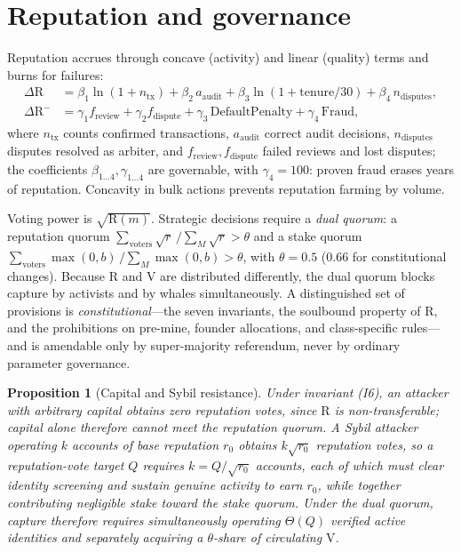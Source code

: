 \documentclass[11pt]{article}
\theoremstyle{plain}
\newtheorem{proposition}{Proposition}
\theoremstyle{definition}
\theoremstyle{remark}
\newcommand{\V}{\mathrm{V}}
\newcommand{\R}{\mathrm{R}}
\begin{document}
\section{Reputation and governance}

Reputation accrues through concave (activity) and linear (quality) terms and burns for failures:
\begin{align}
\Delta \R &= \beta_1 \ln(1 + n_{\mathrm{tx}}) + \beta_2\, a_{\mathrm{audit}} + \beta_3 \ln(1 + \text{tenure}/30) + \beta_4\, n_{\mathrm{disputes}},\\
\Delta \R^{-} &= \gamma_1 f_{\mathrm{review}} + \gamma_2 f_{\mathrm{dispute}} + \gamma_3\, \mathrm{DefaultPenalty} + \gamma_4\, \mathrm{Fraud},
\end{align}
where $n_{\mathrm{tx}}$ counts confirmed transactions, $a_{\mathrm{audit}}$ correct audit decisions, $n_{\mathrm{disputes}}$ disputes resolved as arbiter, and $f_{\mathrm{review}}, f_{\mathrm{dispute}}$ failed reviews and lost disputes; the coefficients $\beta_{1\ldots4},\gamma_{1\ldots4}$ are governable, with $\gamma_4 = 100$: proven fraud erases years of reputation. Concavity in bulk actions prevents reputation farming by volume.

Voting power is $\sqrt{\R(m)}$. Strategic decisions require a \emph{dual quorum}: a reputation quorum $\sum_{\text{voters}}\sqrt{r}\,\big/\sum_{M}\sqrt{r} > \theta$ and a stake quorum $\sum_{\text{voters}} \max(0,b) \,\big/ \sum_{M}\max(0,b) > \theta$, with $\theta = 0.5$ ($0.66$ for constitutional changes). Because $\R$ and $\V$ are distributed differently, the dual quorum blocks capture by activists and by whales simultaneously. A distinguished set of provisions is \emph{constitutional}---the seven invariants, the soulbound property of $\R$, and the prohibitions on pre-mine, founder allocations, and class-specific rules---and is amendable only by super-majority referendum, never by ordinary parameter governance.

\begin{proposition}[Capital and Sybil resistance]\label{prop:sybil}
Under invariant (I6), an attacker with arbitrary capital obtains zero reputation votes, since $\R$ is non-transferable; capital alone therefore cannot meet the reputation quorum. A Sybil attacker operating $k$ accounts of base reputation $r_0$ obtains $k\sqrt{r_0}$ reputation votes, so a reputation-vote target $Q$ requires $k=Q/\sqrt{r_0}$ accounts, each of which must clear identity screening and sustain genuine activity to earn $r_0$, while together contributing negligible stake toward the stake quorum. Under the dual quorum, capture therefore requires simultaneously operating $\Theta(Q)$ verified active identities and separately acquiring a $\theta$-share of circulating $\V$.
\end{proposition}
\end{document}
